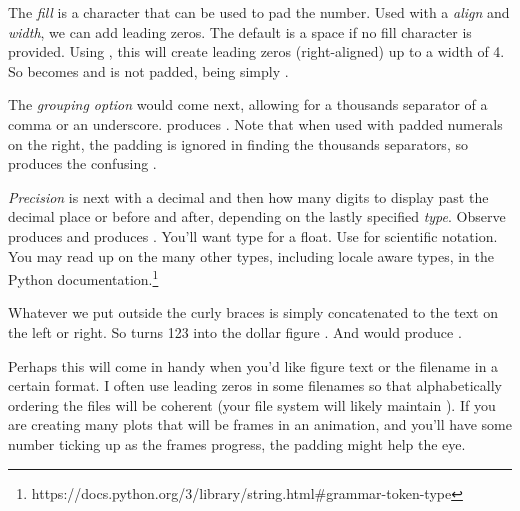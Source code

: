 The \emph{fill} is a character that can be used to pad the number. Used with a \emph{align} and \emph{width}, we can add leading zeros. The default is a space if no fill character is provided. Using , this will create leading zeros (right-aligned) up to a width of 4. So  becomes  and  is not padded, being simply . 

The \emph{grouping option} would come next, allowing for a thousands separator of a comma or an underscore.  produces . Note that when used with padded numerals on the right, the padding is ignored in finding the thousands separators, so  produces the confusing .

\emph{Precision} is next with a decimal and then how many digits to display past the decimal place or before and after, depending on the lastly specified \emph{type}. Observe  produces  and  produces . You'll want type  for a float. Use  for scientific notation. You may read up on the many other types, including locale aware types, in the Python documentation.\footnote{https://docs.python.org/3/library/string.html\#grammar-token-type}

Whatever we put outside the curly braces is simply concatenated to the text on the left or right. So  turns 123 into the dollar figure . And  would produce . 

Perhaps this will come in handy when you'd like figure text or the filename in a certain format. I often use leading zeros in some filenames so that alphabetically ordering the files will be coherent (your file system will likely maintain ). If you are creating many plots that will be frames in an animation, and you'll have some number ticking up as the frames progress, the padding might help the eye.  


